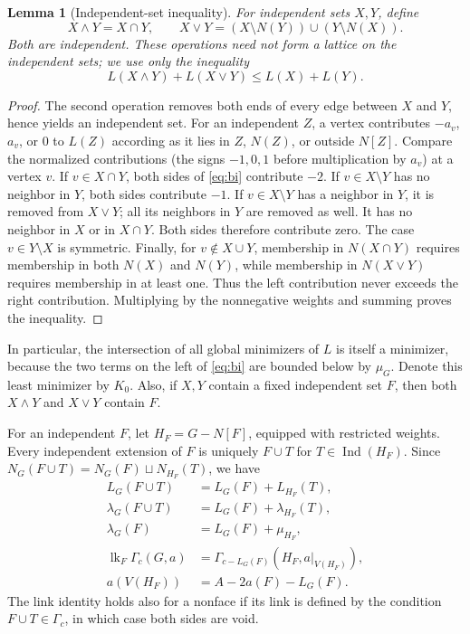 \documentclass[11pt,a4paper]{article}
\newtheorem{lemma}[theorem]{Lemma}
\theoremstyle{definition}
\newcommand{\Ind}{\operatorname{Ind}}
\newcommand{\lk}{\operatorname{lk}}
\newcommand{\G}{\Gamma}
\begin{document}
\begin{lemma}[Independent-set inequality]\label{lem:bi}
For independent sets $X,Y$, define
\[
 X\wedge Y=X\cap Y,\qquad
 X\vee Y=(X\setminus N(Y))\cup(Y\setminus N(X)).
\]
Both are independent. These operations need not form a lattice on the independent sets; we use only the inequality
\begin{equation}\label{eq:bi}
 L(X\wedge Y)+L(X\vee Y)\leq L(X)+L(Y).
\end{equation}
\end{lemma}
\begin{proof}
The second operation removes both ends of every edge between $X$ and $Y$, hence yields an independent set. For an independent $Z$, a vertex contributes $-a_v$, $a_v$, or $0$ to $L(Z)$ according as it lies in $Z$, $N(Z)$, or outside $N[Z]$. Compare the normalized contributions (the signs $-1,0,1$ before multiplication by $a_v$) at a vertex $v$. If $v\in X\cap Y$, both sides of \eqref{eq:bi} contribute $-2$. If $v\in X\setminus Y$ has no neighbor in $Y$, both sides contribute $-1$. If $v\in X\setminus Y$ has a neighbor in $Y$, it is removed from $X\vee Y$; all its neighbors in $Y$ are removed as well. It has no neighbor in $X$ or in $X\cap Y$. Both sides therefore contribute zero. The case $v\in Y\setminus X$ is symmetric. Finally, for $v\notin X\cup Y$, membership in $N(X\cap Y)$ requires membership in both $N(X)$ and $N(Y)$, while membership in $N(X\vee Y)$ requires membership in at least one. Thus the left contribution never exceeds the right contribution. Multiplying by the nonnegative weights and summing proves the inequality.
\end{proof}
In particular, the intersection of all global minimizers of $L$ is itself a minimizer, because the two terms on the left of \eqref{eq:bi} are bounded below by $\mu_G$. Denote this least minimizer by $K_0$. Also, if $X,Y$ contain a fixed independent set $F$, then both $X\wedge Y$ and $X\vee Y$ contain $F$.

For an independent $F$, let $H_F=G-N[F]$, equipped with restricted weights. Every independent extension of $F$ is uniquely $F\cup T$ for $T\in\Ind(H_F)$. Since $N_G(F\cup T)=N_G(F)\sqcup N_{H_F}(T)$, we have
\begin{align}
 L_G(F\cup T)&=L_G(F)+L_{H_F}(T),\label{eq:ext}\\
 \lambda_G(F\cup T)&=L_G(F)+\lambda_{H_F}(T),\nonumber\\
 \lambda_G(F)&=L_G(F)+\mu_{H_F},\label{eq:lambdaext}\\
 \lk_F\G_c(G,a)&=\G_{c-L_G(F)}(H_F,a|_{V(H_F)}),\label{eq:link}\\
 a(V(H_F))&=A-2a(F)-L_G(F).\label{eq:mass}
\end{align}
The link identity holds also for a nonface if its link is defined by the condition $F\cup T\in\G_c$, in which case both sides are void.
\end{document}
